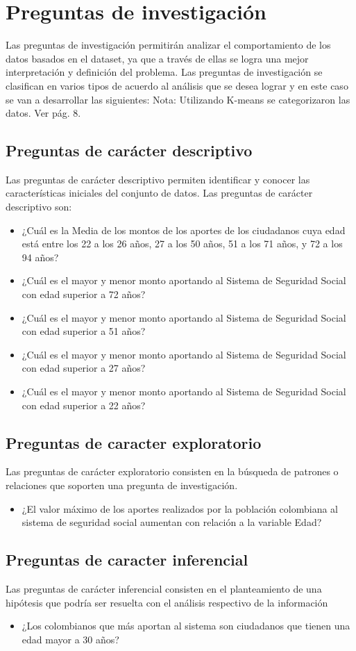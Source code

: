 

\section{Preguntas de investigación}
Las preguntas de investigación permitirán analizar el comportamiento de los datos basados en el dataset, ya que a través de ellas se logra una mejor interpretación  y definición del problema.  Las preguntas de investigación se clasifican en varios tipos de acuerdo al análisis que se desea lograr y en este caso se van a desarrollar las siguientes: Nota: Utilizando K-means se  categorizaron las datos. Ver pág. 8.
 \subsection{Preguntas de carácter descriptivo}
 Las preguntas de carácter descriptivo permiten identificar y conocer las características iniciales del conjunto de datos. Las preguntas de carácter descriptivo son:
  \begin{itemize}
  \item ¿Cuál es la Media de los montos de los aportes de los ciudadanos cuya edad está entre los 22 a los 26 años, 27 a los 50 años, 51 a los 71 años, y 72 a los 94 años?
  \item ¿Cuál es el mayor y menor monto aportando al Sistema de Seguridad Social con edad superior a 72 años?
  \item ¿Cuál es el mayor y menor monto aportando al Sistema de Seguridad Social con edad superior a 51 años?
  \item ¿Cuál es el mayor y menor monto aportando al Sistema de Seguridad Social con edad superior a 27 años?
  \item ¿Cuál es el mayor y menor monto aportando al Sistema de Seguridad Social con edad superior a 22 años? 

  \end{itemize}
  \subsection{Preguntas de caracter exploratorio}
   Las preguntas de carácter exploratorio consisten en la búsqueda de patrones o relaciones que soporten una pregunta de investigación.
  \begin{itemize}
   \item ¿El valor máximo de los aportes realizados por la población colombiana al sistema de seguridad social aumentan con relación a la variable Edad?


  \end{itemize}
  \subsection{Preguntas de caracter inferencial}
   Las preguntas de carácter inferencial consisten en el planteamiento de una hipótesis que podría ser resuelta con el análisis respectivo de la información
  \begin{itemize}
   \item ¿Los colombianos que más aportan al sistema son ciudadanos que tienen una edad mayor a 30 años?
  \end{itemize}
